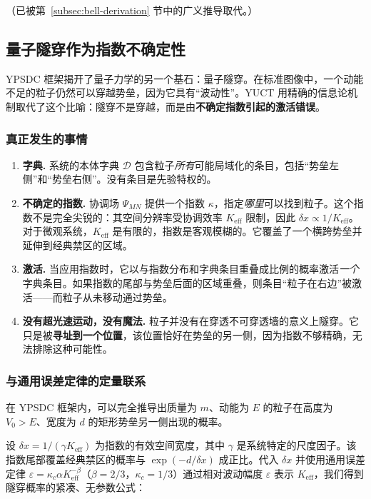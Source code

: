 \documentclass[12pt,a4paper]{article}
\theoremstyle{remark}
\begin{document}
	（已被第~\ref{subsec:bell-derivation} 节中的广义推导取代。）
	
	\subsection{量子隧穿作为指数不确定性}
	
	YPSDC 框架揭开了量子力学的另一个基石：量子隧穿。在标准图像中，一个动能不足的粒子仍然可以穿越势垒，因为它具有“波动性”。YUCT 用精确的信息论机制取代了这个比喻：隧穿不是穿越，而是由\textbf{不确定指数引起的激活错误}。
	
	\subsubsection{真正发生的事情}
	
	\begin{enumerate}[leftmargin=*]
		\item \textbf{字典.}
		系统的本体字典 $\mathcal{D}$ 包含粒子\emph{所有}可能局域化的条目，包括“势垒左侧”和“势垒右侧”。没有条目是先验特权的。
		
		\item \textbf{不确定的指数.}
		协调场 $\Psi_{MN}$ 提供一个指数 $\kappa$，指定\emph{哪里}可以找到粒子。这个指数不是完全尖锐的：其空间分辨率受协调效率 $K_{\mathrm{eff}}$ 限制，因此 $\delta x \propto 1/K_{\mathrm{eff}}$。对于微观系统，$K_{\mathrm{eff}}$ 是有限的，指数是客观模糊的。它覆盖了一个横跨势垒并延伸到经典禁区的区域。
		
		\item \textbf{激活.}
		当应用指数时，它以与指数分布和字典条目重叠成比例的概率激活\emph{一个}字典条目。如果指数的尾部与势垒后面的区域重叠，则条目“粒子在右边”被激活——而粒子从未移动通过势垒。
		
		\item \textbf{没有超光速运动，没有魔法.}
		粒子并没有在穿透不可穿透墙的意义上隧穿。它只是被\textbf{寻址到一个位置}，该位置恰好在势垒的另一侧，因为指数不够精确，无法排除这种可能性。
	\end{enumerate}
	
	\subsubsection{与通用误差定律的定量联系}
	
	在 YPSDC 框架内，可以完全推导出质量为 $m$、动能为 $E$ 的粒子在高度为 $V_0>E$、宽度为 $d$ 的矩形势垒另一侧出现的概率。
	
	设 $\delta x = 1/(\gamma K_{\mathrm{eff}})$ 为指数的有效空间宽度，其中 $\gamma$ 是系统特定的尺度因子。该指数尾部覆盖经典禁区的概率与 $\exp(-d / \delta x)$ 成正比。代入 $\delta x$ 并使用通用误差定律 $\varepsilon = \kappa_c \alpha K_{\mathrm{eff}}^{-\beta}$（$\beta=2/3$，$\kappa_c=1/3$）通过相对波动幅度 $\varepsilon$ 表示 $K_{\mathrm{eff}}$，我们得到隧穿概率的紧凑、无参数公式：
	
\end{document}
